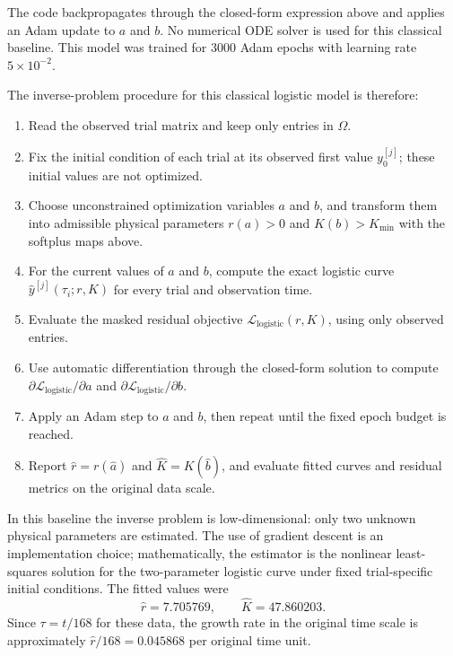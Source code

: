 \documentclass[11pt]{article}
\begin{document}
The code backpropagates through the closed-form expression above and applies an
Adam update \citep{kingma2015adam} to $a$ and $b$. No numerical ODE solver is
used for this classical baseline. This model was trained for 3000 Adam epochs
with learning rate $5\times10^{-2}$.

The inverse-problem procedure for this classical logistic model is therefore:
\begin{enumerate}
  \item Read the observed trial matrix and keep only entries in $\Omega$.
  \item Fix the initial condition of each trial at its observed first value
        $y_0^{[j]}$; these initial values are not optimized.
  \item Choose unconstrained optimization variables $a$ and $b$, and transform
        them into admissible physical parameters $r(a)>0$ and $K(b)>K_{\min}$
        with the softplus maps above.
  \item For the current values of $a$ and $b$, compute the exact logistic curve
        $\widehat y^{[j]}(\tau_i;r,K)$ for every trial and observation time.
  \item Evaluate the masked residual objective
        $\mathcal L_{\mathrm{logistic}}(r,K)$, using only observed entries.
  \item Use automatic differentiation through the closed-form solution to
        compute $\partial \mathcal L_{\mathrm{logistic}}/\partial a$ and
        $\partial \mathcal L_{\mathrm{logistic}}/\partial b$.
  \item Apply an Adam step to $a$ and $b$, then repeat until the fixed epoch
        budget is reached.
  \item Report $\widehat r=r(\widehat a)$ and
        $\widehat K=K(\widehat b)$, and evaluate fitted curves and residual
        metrics on the original data scale.
\end{enumerate}

In this baseline the inverse problem is low-dimensional: only two unknown
physical parameters are estimated. The use of gradient descent is an
implementation choice; mathematically, the estimator is the nonlinear
least-squares solution for the two-parameter logistic curve under fixed
trial-specific initial conditions.
The fitted values were
$$
  \widehat r = 7.705769,
  \qquad
  \widehat K = 47.860203.
$$
Since $\tau=t/168$ for these data, the growth rate in the original time scale
is approximately $\widehat r/168=0.045868$ per original time unit.
\end{document}
